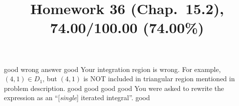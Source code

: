 \documentclass[pstricks,10pt,dvipsnames]{article} %
\title{Homework 36 (Chap.~15.2),
74.00/100.00 (74.00\%)
}
\begin{document}
\maketitle
{}
good
wrong answer
good
Your integration region is wrong. For example, $(4,1)\in D_1$, but $(4,1)$ is NOT included
in triangular region mentioned in problem description.
good
good
good
good
You were asked to rewrite the expression as an ``[\textit{single}] iterated integral''.
good
\end{document}
